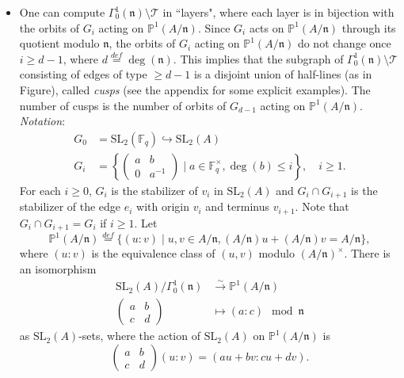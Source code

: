 \documentclass[11pt]{amsart}
\theoremstyle{definition}
\numberwithin{equation}{section}
\newcommand{\SL}{\mathrm{SL}} 	%
\newcommand{\cT}{\mathcal{T}}		%
\newcommand{\bbF}{\mathbb{F}}		%
\newcommand{\bbP}{\mathbb{P}}		%
\begin{document}
\begin{enumerate}
{{\begin{itemize}
					\item One can compute $\Gamma_0^1(\mathfrak{n})\setminus \cT$ in ``layers", where each layer is in bijection with the orbits of $G_i$ acting on $\bbP^1(A/\mathfrak{n})$. 
					Since $G_i$ acts on $\bbP^1(A/\mathfrak{n})$ through its quotient modulo $\mathfrak{n}$, the orbits of $G_i$ acting on $\bbP^1(A/\mathfrak{n})$ do not change once $i\geq d-1$, where $d\overset{def}{=} \deg(\mathfrak{n})$. This implies that the subgraph of $\Gamma_0^1(\mathfrak{n})\setminus \cT$ consisting of edges of type $\geq d-1$ is a disjoint union of half-lines (as in Figure), 
					called \textit{cusps} (see the appendix for some explicit examples). The number of cusps is the number of orbits of $G_{d-1}$ acting on $\bbP^1(A/\mathfrak{n})$.\\
					
					\emph{Notation}:
					\begin{align*}
						G_0 &=\SL_2(\bbF_q)\hookrightarrow \SL_2(A)\\ 
						G_i & = \left\{\begin{pmatrix} a & b \\ 0 & a^{-1} \end{pmatrix}\mid a\in \bbF_q^\times, \deg(b)\leq i \right\}, \quad i\geq 1.  
					\end{align*}For each $i\geq 0$, $G_i$ is the stabilizer of $v_i$ in $\SL_2(A)$ and $G_i\cap G_{i+1}$ is the stabilizer of the 
					edge $e_i$ with origin $v_i$ and terminus $v_{i+1}$. Note that $G_i\cap G_{i+1}=G_i$ if $i\geq 1$. Let 
					$$
					\bbP^1(A/\mathfrak{n})\overset{def}{=} \{(u:v)\mid u, v\in A/\mathfrak{n}, (A/\mathfrak{n})u +(A/\mathfrak{n})v=A/\mathfrak{n}\},
					$$
					where $(u: v)$ is the equivalence class of $(u, v)$ modulo $(A/\mathfrak{n})^\times$. There is an isomorphism 
					\begin{align*}
						\SL_2(A)/\Gamma_0^1(\mathfrak{n}) &\overset{\sim}{\to} \bbP^1(A/\mathfrak{n})\\ 
						\begin{pmatrix} a & b \\ c & d\end{pmatrix} &\longmapsto (a:c)\mod \mathfrak{n}
					\end{align*}
					as $\SL_2(A)$-sets, where the action of $\SL_2(A)$ on $\bbP^1(A/\mathfrak{n})$ is 
					$$
					\begin{pmatrix} a & b \\ c & d\end{pmatrix}  (u:v) =(au+bv : cu+dv). 
					$$
				\end{itemize}			
			}
		}\\
		

\end{enumerate}
\end{document}
